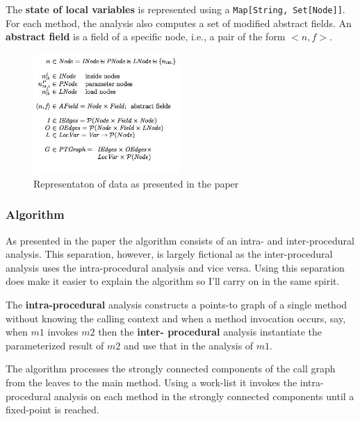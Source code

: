 \documentclass[11pt]{exam}
\begin{document}
The \textbf{state of local variables} is represented using a
\texttt{Map[String, Set[Node]]}. For each method, the analysis also
computes a set of modified abstract fields. An \textbf{abstract field}
is a field of a specific node, i.e., a pair of the form $<n,f>$.

\begin{figure}[h!]
\begin{center}
  \includegraphics[width=0.5\textwidth]{data-representation}
  \caption{Representaton of data as presented in the paper}
\end{center}
\end{figure}

\subsubsection*{Algorithm}

As presented in the paper the algorithm consists of an intra- and
inter-procedural analysis. This separation, however, is largely
fictional as the inter-procedural analysis uses the intra-procedural
analysis and vice versa. Using this separation does make it easier to
explain the algorithm so I'll carry on in the same spirit. \newline

The \textbf{intra-procedural} analysis constructs a points-to graph of
a single method without knowing the calling context and  when a method
invocation occurs, say, when $m1$ invokes $m2$ then the \textbf{inter-
procedural} analysis instantiate the  parameterized result of $m2$ and
use that in the analysis of $m1$. \newline

The algorithm processes the strongly connected components of the call
graph from the leaves to the main method. Using a work-list it invokes
the  intra-procedural analysis on each method in the strongly
connected components until a fixed-point is reached. \newline
\end{document}
